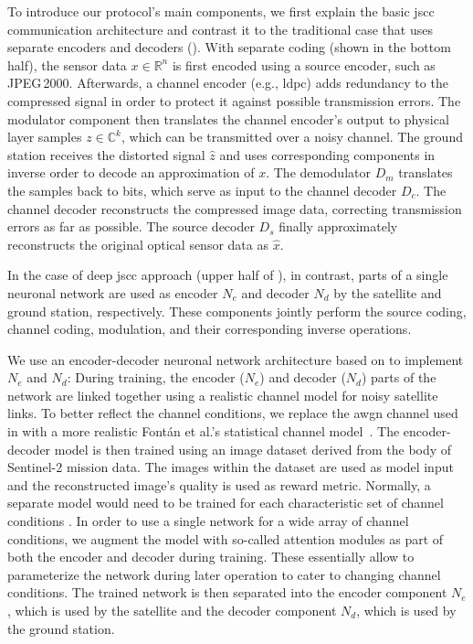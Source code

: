\documentclass[conference]{IEEEtran}
\newcommand\jpegtwok{JPEG\,2000\xspace}
\newcommand\sentinelii{Sentinel-2\xspace}
\begin{document}
To introduce our protocol's main components, we first explain the basic \ac{jscc} communication architecture and contrast it to the traditional case that uses separate encoders and decoders ().
With separate coding (shown in the bottom half), the sensor data $x \in \mathbb{R}^n$ is first encoded using a source encoder, such as \jpegtwok.
Afterwards, a channel encoder (e.g., \ac{ldpc}) adds redundancy to the compressed signal in order to protect it against possible transmission errors.
The modulator component then translates the channel encoder's output to physical layer samples $z \in \mathbb{C}^k$, which can be transmitted over a noisy channel.
The ground station receives the distorted signal $\hat{z}$ and uses corresponding components in inverse order to decode an approximation of $x$.
The demodulator $D_m$ translates the samples back to bits, which serve as input to the channel decoder $D_c$.
The channel decoder reconstructs the compressed image data, correcting transmission errors as far as possible.
The source decoder $D_s$ finally approximately reconstructs the original optical sensor data as $\hat{x}$.

In the case of deep \ac{jscc} approach (upper half of ), in contrast, parts of a single neuronal network are used as encoder $N_e$ and decoder $N_d$ by the satellite and ground station, respectively.
These components jointly perform the source coding, channel coding, modulation, and their corresponding inverse operations.

We use an encoder-decoder neuronal network architecture based on \cite{satjscc} to implement $N_e$ and $N_d$:
During training, the encoder ($N_e$) and decoder ($N_d$) parts of the network are linked together using a realistic channel model for noisy satellite links.
To better reflect the channel conditions, we replace the \ac{awgn} channel used in \cite{satjscc} with a more realistic Fontán et al.'s statistical channel model~\cite{966585}.
The encoder-decoder model is then trained using an image dataset derived from the body of \sentinelii mission data.
The images within the dataset are used as model input and the reconstructed image's quality is used as reward metric.
Normally, a separate model would need to be trained for each characteristic set of channel conditions \cite{satjscc}.
In order to use a single network for a wide array of channel conditions, we augment the model with so-called attention modules \cite{wireless-attention-modules} as part of both the encoder and decoder during training.
These essentially allow to parameterize the network during later operation to cater to changing channel conditions.
The trained network is then separated into the encoder component $N_e$, which is used by the satellite and the decoder component $N_d$, which is used by the ground station.
\end{document}
